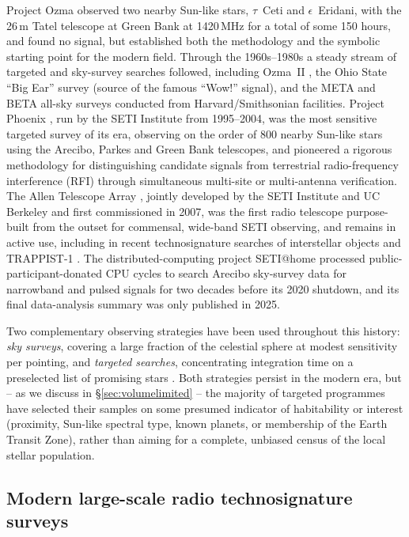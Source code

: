 \documentclass{openjournal}
\begin{document}
Project Ozma \citep{Drake1960} observed two nearby Sun-like stars, $\tau$~Ceti and
$\epsilon$~Eridani, with the 26\,m Tatel telescope at Green Bank at 1420\,MHz for
a total of some 150 hours, and found no signal, but established both the
methodology and the symbolic starting point for the modern field. Through the
1960s--1980s a steady stream of targeted and sky-survey searches followed,
including Ozma~II \citep{Drake1986}, the Ohio State ``Big Ear'' survey (source of
the famous ``Wow!'' signal), and the META and BETA all-sky surveys conducted from
Harvard/Smithsonian facilities. Project Phoenix \citep{Backus2002}, run by the
SETI Institute from 1995--2004, was the most sensitive targeted survey of its era,
observing on the order of 800 nearby Sun-like stars using the Arecibo, Parkes and
Green Bank telescopes, and pioneered a rigorous methodology for distinguishing
candidate signals from terrestrial radio-frequency interference (RFI) through
simultaneous multi-site or multi-antenna verification. The Allen Telescope Array
\citep[ATA;][]{Tarter2001}, jointly developed by the SETI Institute and UC
Berkeley and first commissioned in 2007, was the first radio telescope
purpose-built from the outset for commensal, wide-band SETI observing, and remains
in active use, including in recent technosignature searches of interstellar
objects \citep{ATAISO2025} and TRAPPIST-1 \citep{ATATRAPPIST2024}. The
distributed-computing project SETI@home \citep{SETIhome2025} processed
public-participant-donated CPU cycles to search Arecibo sky-survey data for
narrowband and pulsed signals for two decades before its 2020 shutdown, and its
final data-analysis summary was only published in 2025.

Two complementary observing strategies have been used throughout this history:
\emph{sky surveys}, covering a large fraction of the celestial sphere at modest
sensitivity per pointing, and \emph{targeted searches}, concentrating integration
time on a preselected list of promising stars \citep[e.g.][]{Drake1974}. Both
strategies persist in the modern era, but -- as we discuss in
\S\ref{sec:volumelimited} -- the majority of targeted programmes have selected
their samples on some presumed indicator of habitability or interest (proximity,
Sun-like spectral type, known planets, or membership of the Earth Transit Zone),
rather than aiming for a complete, unbiased census of the local stellar
population.

\subsection{Modern large-scale radio technosignature surveys}
\label{sec:modern}
\end{document}
